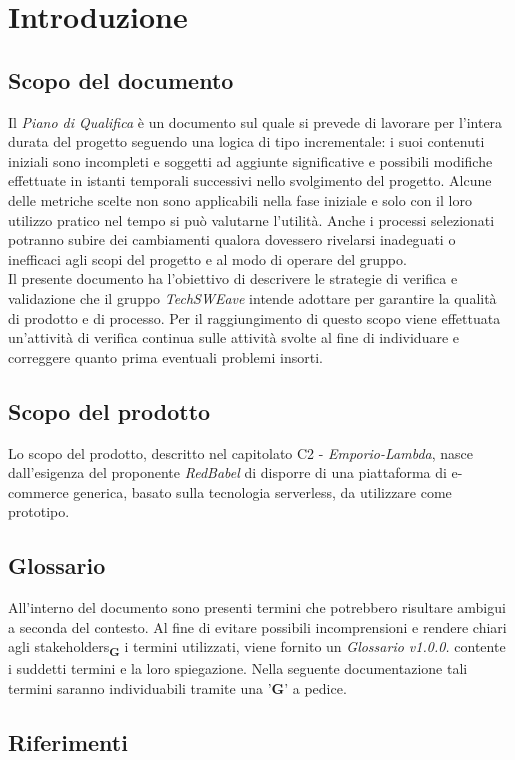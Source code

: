 \section{Introduzione}
\subsection{Scopo del documento}
Il \textit{Piano di Qualifica} è un documento sul quale si prevede di lavorare per l'intera durata del progetto seguendo una
logica di tipo incrementale: i suoi contenuti iniziali sono incompleti e soggetti ad aggiunte significative e possibili modifiche 
effettuate in istanti temporali successivi nello svolgimento del progetto.
Alcune delle metriche scelte non sono applicabili nella fase iniziale e solo con il loro utilizzo pratico nel tempo
si può valutarne l'utilità. Anche i processi selezionati potranno subire dei cambiamenti qualora dovessero rivelarsi
inadeguati o inefficaci agli scopi del progetto e al modo di operare del gruppo.\\
Il presente documento ha l'obiettivo di descrivere le strategie di verifica e validazione che il gruppo \textit{TechSWEave} intende
adottare per garantire la qualità di prodotto e di processo. Per il raggiungimento di questo scopo viene effettuata
un'attività di verifica continua sulle attività svolte al fine di individuare e correggere quanto prima 
eventuali problemi insorti.
\subsection{Scopo del prodotto}
Lo scopo del prodotto, descritto nel capitolato C2 - \textit{Emporio-Lambda}, nasce dall'esigenza del proponente \textit{RedBabel}
di disporre di una piattaforma di e-commerce generica, basato sulla tecnologia serverless, da utilizzare come prototipo.
\subsection{Glossario}
All'interno del documento sono presenti termini che potrebbero risultare ambigui a seconda del contesto. Al fine di evitare possibili incomprensioni 
e rendere chiari agli stakeholders\textsubscript{\textbf{G}} i termini utilizzati, viene fornito un \textit{Glossario v1.0.0.} contente i suddetti termini 
e la loro spiegazione. Nella seguente documentazione tali termini saranno individuabili tramite una '\textbf{G}' a pedice.
\subsection{Riferimenti}
